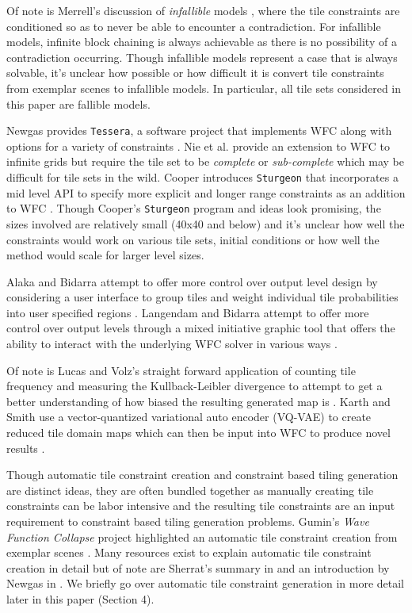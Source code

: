 Of note is Merrell's discussion of \textit{infallible} models \cite{Merrell_2009}, where the tile constraints are
conditioned so as to never be able to encounter a contradiction.
For infallible models, infinite block chaining is always achievable as there is no possibility of a contradiction occurring.
Though infallible models represent a case that is always solvable,
it's unclear how possible or how difficult it is convert tile constraints from exemplar scenes to infallible models.
In particular, all tile sets considered in this paper are fallible models.

Newgas provides \texttt{Tessera}, a software project that implements WFC along with options for a variety of constraints \cite{Newgas_2021}.
Nie et al. provide an extension to WFC to infinite grids but require the tile set to be \textit{complete} or \textit{sub-complete} \cite{Nie_etall_2023}
which may be difficult for tile sets in the wild.
Cooper introduces \texttt{Sturgeon} that incorporates a mid level API to specify more explicit and longer range constraints as an addition
to WFC \cite{Cooper_2022}.
Though Cooper's \texttt{Sturgeon} program and ideas look promising, the sizes involved are relatively small (40x40 and below)
and it's unclear how well the constraints would work on various tile sets, initial conditions or how well the method would scale
for larger level sizes.

Alaka and Bidarra attempt to offer more control over output level design by considering a user interface to group tiles and
weight individual tile probabilities into user specified regions \cite{Alaka_Bidarra_Rafael_2023}.
Langendam and Bidarra attempt to offer more control over output levels through a mixed initiative graphic tool that offers
the ability to interact with the underlying WFC solver in various ways \cite{Langendam_etall_2022}.

Of note is Lucas and Volz's straight forward application of counting tile frequency and measuring the Kullback-Leibler divergence
to attempt to get a better understanding of how biased the resulting generated map is \cite{Lucas_Volz_2019}.
Karth and Smith use a vector-quantized variational auto encoder (VQ-VAE) to create reduced tile domain maps which can then
be input into WFC to produce novel results \cite{Karth_Smith_2017}.


Though automatic tile constraint creation and constraint based tiling generation are distinct ideas, they are often
bundled together as manually creating tile constraints can be labor intensive and the resulting tile constraints
are an input requirement to constraint based tiling generation problems.
Gumin's \textit{Wave Function Collapse} project highlighted an automatic tile constraint creation from exemplar
scenes \cite{Gumin_2016}.
Many resources exist to explain automatic tile constraint creation in detail but of note are Sherrat's summary in
\cite{Sherratt_2019} and an introduction by Newgas in \cite{BorisTheBrave_wfc_2021}.
We briefly go over automatic tile constraint generation in more detail later in this paper (Section 4).

